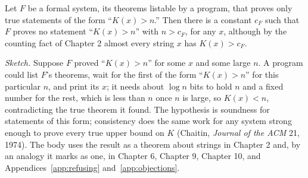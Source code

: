 \begin{theorem}[Chaitin, 1974]
Let $F$ be a formal system, its theorems listable by a program, that proves only true statements of the form ``$K(x) > n$.'' Then there is a constant $c_F$ such that $F$ proves no statement ``$K(x) > n$'' with $n > c_F$, for any $x$, although by the counting fact of Chapter 2 almost every string $x$ has $K(x) > c_F$.
\end{theorem}

\emph{Sketch.} Suppose $F$ proved ``$K(x) > n$'' for some $x$ and some large $n$. A program could list $F$'s theorems, wait for the first of the form ``$K(x) > n$'' for this particular $n$, and print its $x$; it needs about $\log n$ bits to hold $n$ and a fixed number for the rest, which is less than $n$ once $n$ is large, so $K(x) < n$, contradicting the true theorem it found. The hypothesis is soundness for statements of this form; consistency does the same work for any system strong enough to prove every true upper bound on $K$ (Chaitin, \textit{Journal of the ACM} 21, 1974). The body uses the result as a theorem about strings in Chapter 2 and, by an analogy it marks as one, in Chapter 6, Chapter 9, Chapter 10, and Appendices~\ref{app:refusing} and~\ref{app:objections}.
